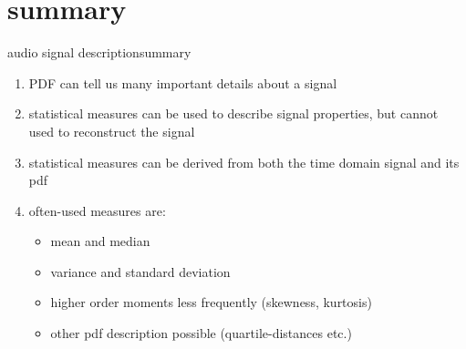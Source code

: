 \section{summary}
\begin{frame}{audio signal description}{summary}
    \begin{enumerate}
        \item   PDF can tell us many important details about a signal
        \smallskip
        \item<2->   statistical measures can be used to describe signal properties, but cannot used to reconstruct the signal
        \smallskip
        \item<3->   statistical measures can be derived from both the time domain signal and its pdf
        \smallskip
        \item<4->   often-used measures are:
            \begin{itemize}
                \item   mean and median
                \item   variance and standard deviation
                \item   higher order moments less frequently (skewness, kurtosis)
                \item   other pdf description possible (quartile-distances etc.)
            \end{itemize}
    \end{enumerate}
\end{frame}		

    


